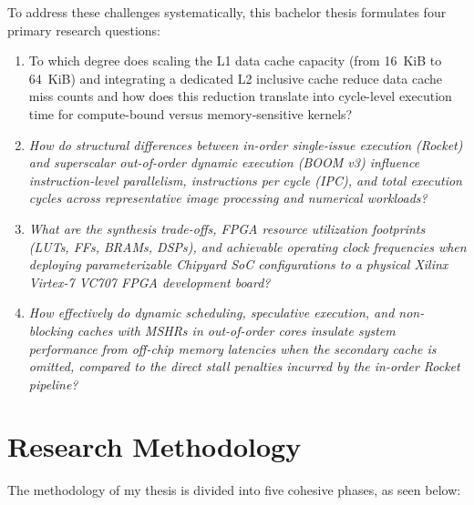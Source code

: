 To address these challenges systematically, this bachelor thesis formulates four primary research questions:

\begin{enumerate}
    \item To which degree does scaling the L1 data cache capacity (from 16~KiB to 64~KiB) and integrating a dedicated L2 inclusive cache reduce data cache miss counts 
    and how does this reduction translate into cycle-level execution time for compute-bound versus memory-sensitive kernels?

    \item \emph{How do structural differences between in-order single-issue execution (Rocket) and superscalar out-of-order dynamic execution (BOOM v3) influence instruction-level parallelism,
    instructions per cycle (IPC), and total execution cycles across representative image processing and numerical workloads?}
    
    \item \emph{What are the synthesis trade-offs, FPGA resource utilization footprints (LUTs, FFs, BRAMs, DSPs), 
    and achievable operating clock frequencies when deploying parameterizable Chipyard SoC configurations to a physical Xilinx Virtex-7 VC707 FPGA development board?}

    \item \emph{How effectively do dynamic scheduling, speculative execution, and non-blocking caches with MSHRs in out-of-order cores insulate system performance from off-chip memory 
    latencies when the secondary cache is omitted, compared to the direct stall penalties incurred by the in-order Rocket pipeline?}
\end{enumerate}

\section{Research Methodology}
\label{sec:research_methodology}

The methodology of my thesis is divided into five cohesive phases, as seen below:

